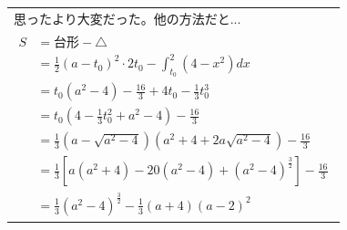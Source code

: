 \documentclass[../main.tex]{subfiles}
\begin{document}
\begin{center}
  \begin{tabular}{|l|}
    \hline
    思ったより大変だった。他の方法だと... \\
    \begin{minipage}{0.9\textwidth}
      \begin{align*}
        S &= \text{台形} - \triangle \\
        &= \frac{1}{2} (a-t_0)^2 \cdot 2t_0 - \int_{t_0}^2 (4-x^2) dx \\
        &= t_0 (a^2-4) - \frac{16}{3} + 4t_0 - \frac{1}{3} t_0^3 \\
        &= t_0 \left( 4 - \frac{1}{3} t_0^2 + a^2-4 \right) - \frac{16}{3} \\
        &= \frac{1}{3} (a - \sqrt{a^2-4}) \left( a^2 + 4 + 2a\sqrt{a^2-4} \right) - \frac{16}{3} \\
        &= \frac{1}{3} \left[ a(a^2+4) - 20(a^2-4) + (a^2-4)^{\frac{3}{2}} \right] - \frac{16}{3} \\
        &= \frac{1}{3}(a^2-4)^{\frac{3}{2}} - \frac{1}{3}(a+4)(a-2)^2
      \end{align*}
    \end{minipage} \\
    \hline
  \end{tabular}
\end{center}
\end{document}
